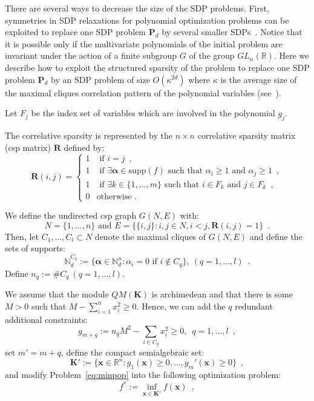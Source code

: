 \documentclass[a4paper,10pt]{article}
\newcommand{\suppf}[1]{\text{supp}(#1)}
\newcommand{\mons}[2]{\N_{#1}^{#2}}
\newcommand{\R}{\mathbb{R}}
\newcommand{\N}{\mathbb{N}}
\newcommand{\x}{\mathbf{x}}
\newcommand{\alphab}{\boldsymbol{\alpha}}
\def\P{\mathbf{P}}
\def\K{\mathbf{K}}
\theoremstyle{plain}
\theoremstyle{definition}
\theoremstyle{remark}
\begin{document}
There are several ways to decrease the size of the SDP problems. 
First, symmetries in SDP relaxations for polynomial optimization problems can be exploited to replace one SDP problem $\P_d$ by
several smaller SDPs~\cite{Riener2013SymmetricSDP}. Notice that it is possible only if the multivariate polynomials of the initial problem are invariant under the action of a finite subgroup $G$ of the group $GL_{n}(\R)$. 
%
Here we describe how to exploit the structured sparsity of the
problem to replace one SDP problem $\P_d$ by an SDP problem of
size $O (\kappa^ {2 d})$ where $\kappa$ is the average size
of the maximal cliques correlation pattern of the polynomial
variables (see~\cite{Waki06SparseSOS}). 

Let $F_j$ be the index set of variables which are involved in the polynomial $g_j$. 
 
The correlative sparsity is represented by the 
$n \times n$ correlative sparsity matrix (csp matrix) $\mathbf{R}$ defined by:
\begin{equation}
\label{eq:csp}
\mathbf{R}(i, j) = \left \{
\begin{array}{ll}
  1 & \text{ if }  i = j \enspace, \\
  1 & \text{ if }  \exists \alphab \in \suppf{f} \text{ such that } \alpha_i \geq 1 \text{ and } \alpha_j \geq 1\enspace, \\
  1 & \text{ if }  \exists k \in \{1, \dots, m\} \text{ such that } i \in F_k \text{ and } j \in F_k \enspace,\\
  0 & \text{otherwise .} 
\end{array} \right.
\end{equation}

We define the undirected csp graph $G(N, E)$ with:
 \[ N = \{1, \dots, n\} \text{ and } E = \{ \{i, j\} : i, j \in N, i < j, \mathbf{R}(i, j) = 1 \} \enspace. \]
Then, let $C_1,\dots, C_l \subset N$ denote the maximal cliques of $G(N, E)$ and define the sets of supports: 
\[\mons{d}{C_q} := \{ \alphab \in  \mons{d}{n} : \alpha_i = 0 \text{ if } i \notin C_q \}, \ (q=1 ,\dots,l)\enspace. \]
Define $n_q := \#C_q \ (q=1 ,\dots,l)$.

We assume that the module $QM(\K)$ is archimedean and that there is some $M > 0$ such that $M - \sum_{i = 1}^{n} {x_i^2} \geq 0$. Hence, we can add the $q$ redundant additional constraints:
\begin{equation}
\label{eq:assum_sos_sparse}
g_{m + q} := n_q M^2 - \sum_{i \in C_q} {x_i^2} \geq 0, \enspace q=1 ,\dots, l\enspace,
\end{equation}
set $m' = m + q$, define the compact semialgebraic set:
\[\K' := \{ \x \in \R^{n} : g_1 (\x) \geq 0, \dots, g_m' (\x) \geq 0\}\enspace,\]
and modify Problem~\eqref{eq:minpop} into the following optimization problem:
\begin{equation}
\label{eq:cons_pop_sparse}
f^*  :=  \inf_{\x \in \K'} f (\x)\enspace,
\end{equation}
\end{document}
